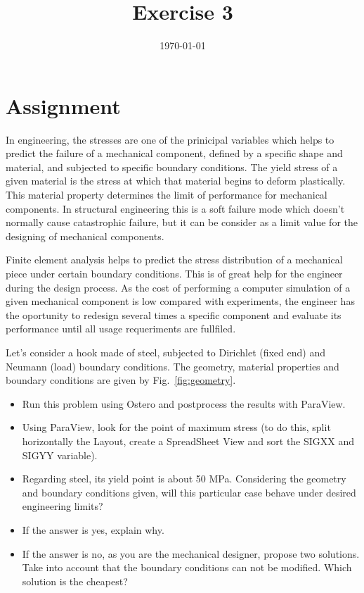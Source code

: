 \documentclass[12pt]{article}
\title{Exercise 3}
\date{\today}
\begin{document}
\maketitle

\section{Assignment}
In engineering, the stresses are one of the prinicipal variables which helps to predict the failure of a mechanical component, defined by a specific shape and material, and subjected to specific boundary conditions. The yield stress of a given material is the stress at which that material begins to deform plastically. This material property determines the limit of performance for mechanical components. In structural engineering this is a soft failure mode which doesn't normally cause catastrophic failure, but it can be consider as a limit value for the designing of mechanical components.

Finite element analysis helps to predict the stress distribution of a mechanical piece under certain boundary conditions. This is of great help for the engineer during the design process. As the cost of performing a computer simulation of a given mechanical component is low compared with experiments, the engineer has the oportunity to redesign several times a specific component and evaluate its performance until all usage requeriments are fullfiled. 

\medskip

Let's consider a hook made of steel, subjected to Dirichlet (fixed end) and Neumann (load) boundary conditions. The geometry, material properties and boundary conditions are given by Fig.~\ref{fig:geometry}.
\begin{itemize}
\item Run this problem using Ostero and postprocess the results with ParaView.
\item Using ParaView, look for the point of maximum stress (to do this, split horizontally the Layout, create a SpreadSheet View and sort the SIGXX and SIGYY variable).
\item Regarding steel, its yield point is about 50 MPa. Considering the geometry and boundary conditions given, will this particular case behave under desired engineering limits?
\item If the answer is yes, explain why.
\item If the answer is no, as you are the mechanical designer, propose two solutions. Take into account that the boundary conditions can not be modified. Which solution is the cheapest? 
\end{itemize}
\end{document}
